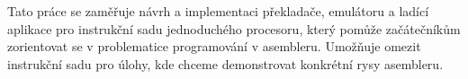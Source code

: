 Tato práce se zaměřuje návrh a implementaci překladače, emulátoru a ladící aplikace pro instrukční sadu jednoduchého procesoru, který pomůže začátečníkům zorientovat se v problematice programování v asembleru. Umožňuje omezit instrukční sadu pro úlohy, kde chceme demonstrovat konkrétní rysy asembleru.